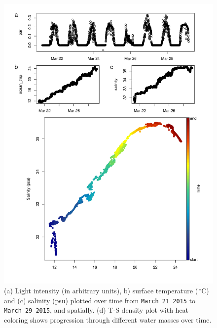 \documentclass[a4paper]{article}
\begin{document}
\begin{figure}[H]
\centering
\includegraphics{CruiseReport-006}


\caption{(a) Light intensity (in arbitrary units), b) surface temperature ($\,^{\circ}\mathrm{C}$) and (c) salinity (psu) plotted over time from \texttt{March 21 2015} to \texttt{March 29 2015}, and spatially.  (d) T-S density plot with heat coloring shows progression through different water masses over time.}%
\end{figure}
\end{document}
